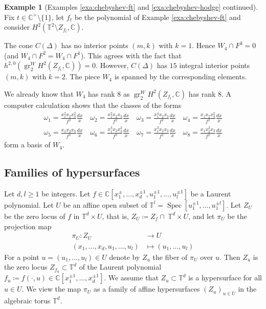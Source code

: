 \documentclass[11pt, reqno]{amsart}
\theoremstyle{plain}
\theoremstyle{definition}
\newtheorem{example}[thm]{Example}
\newcommand{\CC}{\mathbb{C}}
\newcommand{\TT}{\mathbb{T}}
\DeclareMathOperator{\Spec}{Spec}
\DeclareMathOperator{\gr}{gr}
\newcommand{\bs}{}
\begin{document}
\begin{example}[Examples \ref{exa:chebyshev-ft} and \ref{exa:chebyshev-hodge} continued]
\label{exa:chebyshev-cone}
Fix $t\in \CC^\times \setminus \{ 1\}$, let $f_t$ be the polynomial of Example \ref{exa:chebyshev-ft} and   consider $H^2(\TT^2 \setminus Z_{f_t}, \CC)$.

The cone $C(\Delta)$ has no interior points $(m,k)$ with $k=1$. Hence $W_4 \cap F^3=0$ (and $W_4 \cap F^2=W_4 \cap F^1$). This 
agrees with the fact that  $h^{2,0}(\gr_2^W H^{2}(Z_{f_t},\CC))=0$. However, $C(\Delta)$ has $15$  integral interior points $(m,k)$ with $k=2$. The piece $W_4$ is spanned by the corresponding elements. 

We already know that $W_4$ has rank $8$ as $\gr_2^WH^2(Z_{f_t}, \CC)$ has rank $8$. A computer calculation shows that 
the classes of the forms
\begin{align*}
   \omega_1= \frac{x_1^2x_2x_3^2}{f^2}\frac{dx}{x}  \quad  \omega_2= \frac{x_1^2x_2x_3}{f^2}\frac{dx}{x} \quad \omega_3= \frac{x_1^4x_2x_3}{f^2}\frac{dx}{x}  \quad  \omega_4 = \frac{x_1x_2x_3^2}{f^2}\frac{dx}{x} \\
   \omega_5= \frac{x_1x_2x_3}{f^2}\frac{dx}{x}  \quad  \omega_6= \frac{x_1^3x_2x_3^2}{f^2}\frac{dx}{x} \quad \omega_7= \frac{x_1^3x_2x_3}{f^2}\frac{dx}{x}  \quad  \omega_8 = \frac{x_1x_2^2x_3}{f^2}\frac{dx}{x} 
\end{align*} form a basis of $W_4$. 
\end{example}

\subsection{Families of hypersurfaces} \label{subsec:families}
Let $d, l \geq 1$ be integers. Let $\bs  f  \in \CC[x_1^{\pm},\dots,x_d^{\pm1}, u_1^{\pm 1},\dots, u_l^{\pm 1}]$ be a Laurent polynomial. 
Let $\bs U$ be an affine open subset of  $\TT^l=\Spec[u_1^{\pm 1}, \dots, u_1^{\pm l}]$.  Let $Z_U$ be the zero locus of ${\bs f}$ in $\TT^d \times \bs U$, that is, $Z_U \coloneqq Z_f \cap \; \TT^d \times U$, and let $\pi_U$ 
be the projection map
\begin{align}
\label{eq:projection}
     \bs{\pi_U}: \bs{Z_U} &\to \bs{U}\\
        (x_1, \dots, x_d,u_1, \dots, u_l) &\mapsto  (u_1, \dots, u_l)
\end{align}
For a point $u=(u_1, \dots, u_l) \in \bs{U}$  denote by $\bs{Z}_u$ the fiber of $\pi_{U}$ over $u$. Then $Z_u$ is the zero locus $Z_{\bs{f}_u} \subset \TT^d$ of the Laurent polynomial $\bs{f}_u\coloneqq \bs{f}(\cdot,u) \in \CC[x_1^{\pm 1},\dots,x_d^{\pm 1}]$. 
We assume that $Z_u \subset \TT^d$ is a hypersurface for all $u \in U$.
We view the map ${\pi_U}$ as a family of affine hypersurfaces $(Z_u)_{u \in U}$ in the algebraic torus $\mathbb{T}^{d}$.  
\end{document}

